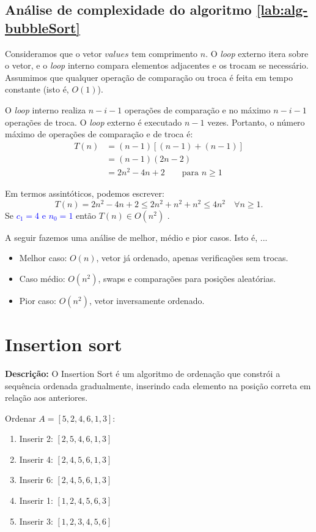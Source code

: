 \subsection{Análise de complexidade do algoritmo \ref{lab:alg-bubbleSort}}

Consideramos que o vetor $values$ tem comprimento $n$.
O \textit{loop} externo itera sobre o vetor, e o \textit{loop} interno compara elementos adjacentes e os trocam se necessário. Assumimos que qualquer operação de comparação ou troca é feita em tempo constante (isto é, $O(1)$).

O \textit{loop} interno realiza $n-i-1$ operações de comparação e no máximo $n-i-1$ operações de troca. O \textit{loop} externo é executado $n-1$ vezes. Portanto, o número máximo de operações de comparação e de troca é:
\begin{align*}
T(n) & = (n-1) [(n-1) + (n-1)]\\
     & = (n-1) (2n-2)\\
     & = 2n^2 - 4n + 2   \quad\quad \text{para } n\geq 1 
\end{align*}

Em termos assintóticos, podemos escrever:
$$T(n)=2n^2 - 4n + 2 \leq 2n^2 + n^2 + n^2 \leq 4n^2\quad \forall n\geq 1.$$
Se \textcolor{blue}{$c_1=4$ e $n_0=1$} então $T(n)\in O(n^2)$ . 

A seguir fazemos uma análise de melhor, médio e pior casos. Isto é, ...
\begin{itemize}
    \item Melhor caso: $O(n)$, vetor já ordenado, apenas verificações sem trocas.

     \item Caso médio: $O(n^2)$, swaps e comparações para posições aleatórias.

     \item Pior caso: $O(n^2)$, vetor inversamente ordenado.
\end{itemize}


\section{Insertion sort}
\textbf{Descrição:} O Insertion Sort é um algoritmo de ordenação que constrói a sequência ordenada gradualmente, inserindo cada elemento na posição correta em relação aos anteriores.

\begin{exmp}
Ordenar $A = [5, 2, 4, 6, 1, 3]$:

\begin{enumerate}
    \item Inserir 2: $[2,5,4,6,1,3]$
    \item Inserir 4: $[2,4,5,6,1,3]$
    \item Inserir 6: $[2,4,5,6,1,3]$
    \item Inserir 1: $[1,2,4,5,6,3]$
    \item Inserir 3: $[1,2,3,4,5,6]$
\end{enumerate}

\end{exmp}

